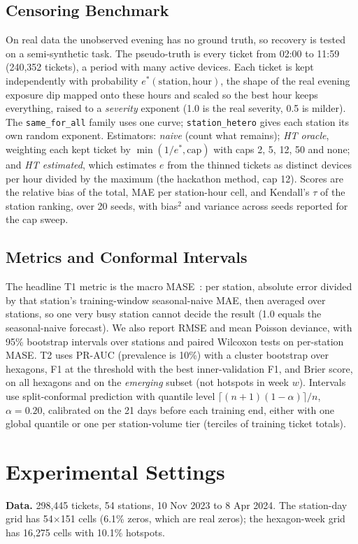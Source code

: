 \documentclass[conference]{IEEEtran}
\begin{document}
\subsection{Censoring Benchmark}
On real data the unobserved evening has no ground truth, so recovery is tested on a semi-synthetic task. The pseudo-truth is every ticket from 02:00 to 11:59 (240{,}352 tickets), a period with many active devices. Each ticket is kept independently with probability \(e^*(\text{station},\text{hour})\), the shape of the real evening exposure dip mapped onto these hours and scaled so the best hour keeps everything, raised to a \emph{severity} exponent (1.0 is the real severity, 0.5 is milder). The \texttt{same\_for\_all} family uses one curve; \texttt{station\_hetero} gives each station its own random exponent. Estimators: \emph{naive} (count what remains); \emph{HT oracle}, weighting each kept ticket by \(\min(1/e^*,\text{cap})\) with caps 2, 5, 12, 50 and none; and \emph{HT estimated}, which estimates \(e\) from the thinned tickets as distinct devices per hour divided by the maximum (the hackathon method, cap 12). Scores are the relative bias of the total, MAE per station-hour cell, and Kendall's \(\tau\) of the station ranking, over 20 seeds, with bias\(^2\) and variance across seeds reported for the cap sweep.

\subsection{Metrics and Conformal Intervals}
The headline T1 metric is the macro MASE~\cite{hyndman2006another}: per station, absolute error divided by that station's training-window seasonal-naive MAE, then averaged over stations, so one very busy station cannot decide the result (1.0 equals the seasonal-naive forecast). We also report RMSE and mean Poisson deviance, with 95\% bootstrap intervals over stations and paired Wilcoxon tests on per-station MASE. T2 uses PR-AUC (prevalence is 10\%) with a cluster bootstrap over hexagons, F1 at the threshold with the best inner-validation F1, and Brier score, on all hexagons and on the \emph{emerging} subset (not hotspots in week \(w\)). Intervals use split-conformal prediction with quantile level \(\lceil (n{+}1)(1{-}\alpha)\rceil/n\), \(\alpha=0.20\), calibrated on the 21 days before each training end, either with one global quantile or one per station-volume tier (terciles of training ticket totals).

\section{Experimental Settings}
\textbf{Data.} 298{,}445 tickets, 54 stations, 10 Nov 2023 to 8 Apr 2024. The station-day grid has 54\(\times\)151 cells (6.1\% zeros, which are real zeros); the hexagon-week grid has 16{,}275 cells with 10.1\% hotspots.
\end{document}
